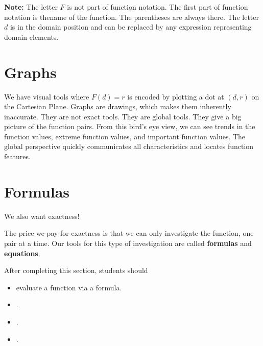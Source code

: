 \documentclass{ximera}
\begin{document}
\textbf{Note:}  The letter $F$ is not part of function notation.  The first part of function notation is thename of the function. The parentheses are always there.  The letter $d$ is in the domain position and can be replaced by any expression representing domain elements.










\section{Graphs}

We have visual tools where $F(d) = r$ is encoded by plotting a dot at $(d, r)$ on the Cartesian Plane.  Graphs are drawings, which makes them inherently inaccurate.  They are not exact tools.  They are global tools.  They give a big picture of the function pairs.  From this bird's eye view, we can see trends in the function values, extreme function values, and important function values. The global perspective quickly communicates all characteristics and locates function features.












\section{Formulas}
We also want exactness!

The price we pay for exactness is that we can only investigate the function, one pair at a time.  Our tools for this type of investigation are called \textbf{formulas} and \textbf{equations}.































\begin{sectionOutcomes}
After completing this section, students should 

\begin{itemize}
\item evaluate a function via a formula.
\item .
\item .
\item .
\end{itemize}
\end{sectionOutcomes}
\end{document}
